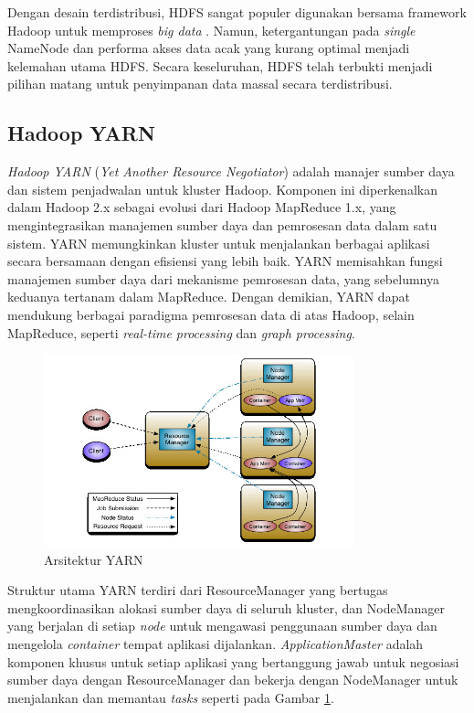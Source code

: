 Dengan desain terdistribusi, HDFS sangat populer digunakan bersama framework Hadoop untuk memproses \textit{big data} \cite{almansouriHadoopDistributedFile2019}. Namun, ketergantungan pada \textit{single} NameNode dan performa akses data acak yang kurang optimal menjadi kelemahan utama HDFS. Secara keseluruhan, HDFS telah terbukti menjadi pilihan matang untuk penyimpanan data massal secara terdistribusi.

\subsection{Hadoop YARN}
\textit{Hadoop YARN} (\textit{Yet Another Resource Negotiator}) adalah manajer sumber daya dan sistem penjadwalan untuk kluster Hadoop. Komponen ini diperkenalkan dalam Hadoop 2.x sebagai evolusi dari Hadoop MapReduce 1.x, yang mengintegrasikan manajemen sumber daya dan pemrosesan data dalam satu sistem. YARN memungkinkan kluster untuk menjalankan berbagai aplikasi secara bersamaan dengan efisiensi yang lebih baik.  YARN memisahkan fungsi manajemen sumber daya dari mekanisme pemrosesan data, yang sebelumnya keduanya tertanam dalam MapReduce. Dengan demikian, YARN dapat mendukung berbagai paradigma pemrosesan data di atas Hadoop, selain MapReduce, seperti \textit{real-time processing} dan \textit{graph processing}.

\begin{figure}[h!]
    \centering
    \includegraphics[width=0.8\textwidth]{figures/ch02/yarn-arch}
    \caption{Arsitektur YARN \cite{ApacheHadoopApache}}
    \label{fig:yarn_arch}
\end{figure}

Struktur utama YARN terdiri dari ResourceManager yang bertugas mengkoordinasikan alokasi sumber daya di seluruh kluster, dan NodeManager yang berjalan di setiap \textit{node} untuk mengawasi penggunaan sumber daya dan mengelola \textit{container} tempat aplikasi dijalankan. \textit{ApplicationMaster} adalah komponen khusus untuk setiap aplikasi yang bertanggung jawab untuk negosiasi sumber daya dengan ResourceManager dan bekerja dengan NodeManager untuk menjalankan dan memantau \textit{tasks} seperti pada Gambar \ref{fig:yarn_arch}.

